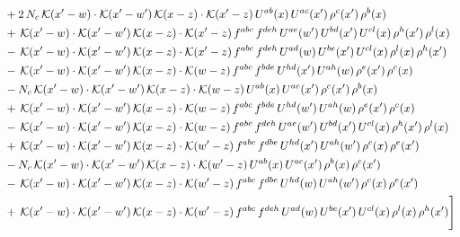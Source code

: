 \documentclass[9pt]{article}
\numberwithin{equation}{section}
\begin{document}
\begin{align}
& +2\,N_{c}\,\mathcal{K}(x'-w)\cdot\mathcal{K}(x'-w')\,\mathcal{K}(x-z)\cdot\mathcal{K}(x'-z)\,U^{ab}(x)\,U^{ac}(x')\,\rho^{c}(x')\,\rho^{b}(x)\notag\\
& +\,\mathcal{K}(x'-w)\cdot\mathcal{K}(x'-w')\,\mathcal{K}(x-z)\cdot\mathcal{K}(x'-z)\,f^{abc}\,f^{deh}\,U^{ae}(w')\,U^{bd}(x')\,U^{cl}(x)\,\rho^{h}(x')\,\rho^{l}(x)\notag\\
& -\,\mathcal{K}(x'-w)\cdot\mathcal{K}(x'-w')\,\mathcal{K}(x-z)\cdot\mathcal{K}(x'-z)\,f^{abc}\,f^{deh}\,U^{ad}(w)\,U^{be}(x')\,U^{cl}(x)\,\rho^{l}(x)\,\rho^{h}(x')\notag\\
& -\,\mathcal{K}(x'-w)\cdot\mathcal{K}(x'-w')\,\mathcal{K}(x-z)\cdot\mathcal{K}(w-z)\,f^{abc}\,f^{bde}\,U^{hd}(x')\,U^{ah}(w)\,\rho^{e}(x')\,\rho^{c}(x)\notag\\
& -N_{c}\,\mathcal{K}(x'-w)\cdot\mathcal{K}(x'-w')\,\mathcal{K}(x-z)\cdot\mathcal{K}(w-z)\,U^{ab}(x)\,U^{ac}(x')\,\rho^{c}(x')\,\rho^{b}(x)\notag\\
& +\,\mathcal{K}(x'-w)\cdot\mathcal{K}(x'-w')\,\mathcal{K}(x-z)\cdot\mathcal{K}(w-z)\,f^{abc}\,f^{bde}\,U^{hd}(w')\,U^{ah}(w)\,\rho^{e}(x')\,\rho^{c}(x)\notag\\
& -\,\mathcal{K}(x'-w)\cdot\mathcal{K}(x'-w')\,\mathcal{K}(x-z)\cdot\mathcal{K}(w-z)\,f^{abc}\,f^{deh}\,U^{ae}(w')\,U^{bd}(x')\,U^{cl}(x)\,\rho^{h}(x')\,\rho^{l}(x)\notag\\
& +\,\mathcal{K}(x'-w)\cdot\mathcal{K}(x'-w')\,\mathcal{K}(x-z)\cdot\mathcal{K}(w'-z)\,f^{abc}\,f^{dbe}\,U^{hd}(x')\,U^{ah}(w')\,\rho^{c}(x)\,\rho^{e}(x')\notag\\
& -N_{c}\,\mathcal{K}(x'-w)\cdot\mathcal{K}(x'-w')\,\mathcal{K}(x-z)\cdot\mathcal{K}(w'-z)\,U^{ab}(x)\,U^{ac}(x')\,\rho^{b}(x)\,\rho^{c}(x')\notag\\
& -\,\mathcal{K}(x'-w)\cdot\mathcal{K}(x'-w')\,\mathcal{K}(x-z)\cdot\mathcal{K}(w'-z)\,f^{abc}\,f^{dbe}\,U^{hd}(w)\,U^{ah}(w')\,\rho^{c}(x)\,\rho^{e}(x')\notag\\
& +\,\mathcal{K}(x'-w)\cdot\mathcal{K}(x'-w')\,\mathcal{K}(x-z)\cdot\mathcal{K}(w'-z)\,f^{abc}\,f^{deh}\,U^{ad}(w)\,U^{be}(x')\,U^{cl}(x)\,\rho^{l}(x)\,\rho^{h}(x') \Bigg]
\end{align}
\end{document}
